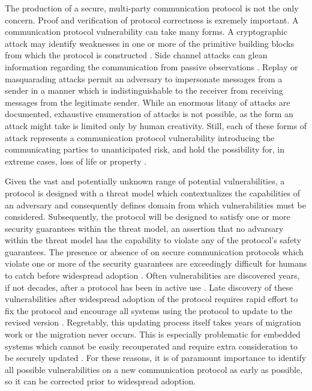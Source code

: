 The production of a secure, multi-party communication protocol is not the only concern.
Proof and verification of protocol correctness \autocite{kobeissi2017automated, alwen2019double, chen2021anonymous, bienstock2022more} is exremely important.
A communication protocol vulnerability can take many forms.
A cryptographic attack may identify weaknesses in one or more of the primitive building blocks from which the protocol is constructed \autocite{al2008comparative}.
Side channel attacks can glean information regarding the communication from passive observations \autocite{kocher1996timing, molnar2005program, chen2010side}.
Replay or masquarading attacks \autocite{syverson1994taxonomy, pries2008new, ustun2019novel} permit an adversary to impersonate messages from a sender in a manner which is indistinguishable to the receiver from receiving messages from the legitimate sender.
While an enormous litany of attacks are documented, exhaustive enumeration of attacks is not possible, as the form an attack might take is limited only by human creativity.
Still, each of these forms of attack represents a communication protocol vulnerability introducing the communicating parties to unanticipated risk, and hold the possibility for, in extreme cases, loss of life or property \autocite{farwell2011stuxnet, 10.1145/2508701, chung2017critical, kagalwalla2019cybersecurity, gunduz2020cyber}.

Given the vast and potentially unknown range of potential vulnerabilities, a protocol is designed with a threat model \autocite{salter1998toward} which contextualizes the capabilities of an adversary and consequently defines domain from which vulnerabilities must be considered.
Subsequently, the protocol will be designed to satisfy one or more security guarantees \autocite{rfc3552} within the threat model, an assertion that no advarsary within the threat model has the capability to violate any of the protocol's safety guarantees.
The presence or absence of  on secure communication protocols which violate one or more of the security guarantees are exceedingly difficult for humans to catch before widespread adoption \autocite{clark1997survey}.
Often vulnerabilities are discovered years, if not decades, after a protocol has been in active use \autocite{durumeric2014matter, shaik2015practical, cremers2017comprehensive, basin2018formal}.
Late discovery of these vulnerabilities after widespread adoption of the protocol requires rapid effort to fix the protocol and encourage all systems using the protocol to update to the revised version \autocite{ghafoor2014analysis}.
Regretably, this updating process itself takes years of migration work \autocite{markowsky2015scanning} or the migration never occurs.
This is especially problematic for embedded systems which cannot be easily recouperated and require extra consideration to be securely updated \autocite{yoon2017remote, maroof2022irecover}.
For these reasons, it is of paramount importance to identify all possible vulnerabilities on a new communication protocol as early as possible, so it can be corrected prior to widespread adoption.

